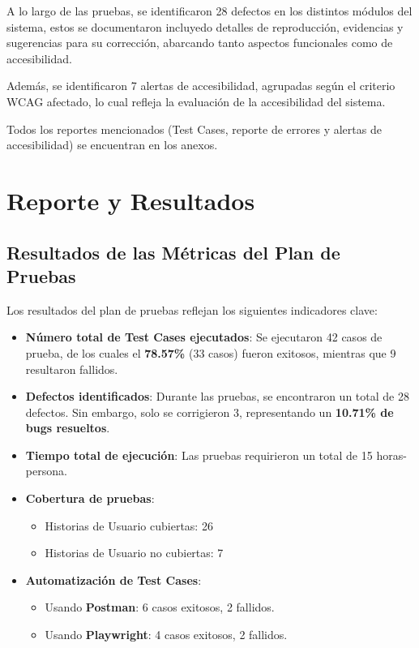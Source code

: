 \documentclass[stu, 12pt, letterpaper, donotrepeattitle, floatsintext, natbib]{apa7}
\begin{document}
A lo largo de las pruebas, se identificaron 28 defectos en los distintos módulos del sistema, estos se documentaron incluyedo detalles de reproducción, evidencias y sugerencias para su corrección, abarcando tanto aspectos funcionales como de accesibilidad. 

Además, se identificaron 7 alertas de accesibilidad, agrupadas según el criterio WCAG afectado, lo cual refleja la evaluación de la accesibilidad del sistema. 

\noindent Todos los reportes mencionados (Test Cases, reporte de errores y alertas de accesibilidad) se encuentran en los anexos.
\section{Reporte y Resultados}


\subsection{Resultados de las Métricas del Plan de Pruebas}

\noindent Los resultados del plan de pruebas reflejan los siguientes indicadores clave:  

\begin{itemize}
    \item \textbf{Número total de Test Cases ejecutados}: Se ejecutaron 42 casos de prueba, de los cuales el \textbf{78.57\%} (33 casos) fueron exitosos, mientras que 9 resultaron fallidos.
    \item \textbf{Defectos identificados}: Durante las pruebas, se encontraron un total de 28 defectos. Sin embargo, solo se corrigieron 3, representando un \textbf{10.71\% de bugs resueltos}.
    \item \textbf{Tiempo total de ejecución}: Las pruebas requirieron un total de 15 horas-persona.
    \item \textbf{Cobertura de pruebas}: 
    \begin{itemize}
        \item Historias de Usuario cubiertas: 26  
        \item Historias de Usuario no cubiertas: 7
    \end{itemize}
    \item \textbf{Automatización de Test Cases}: 
    \begin{itemize}
        \item Usando \textbf{Postman}: 6 casos exitosos, 2 fallidos.
        \item Usando \textbf{Playwright}: 4 casos exitosos, 2 fallidos.
    \end{itemize}
\end{itemize}
\end{document}
